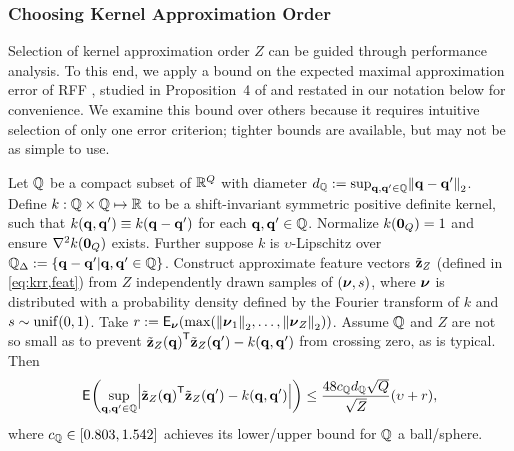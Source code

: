 \subsubsection{Choosing Kernel Approximation Order}
\label{sss,krr,pract,mod,h}

Selection of kernel approximation order $Z$ 
can be guided through performance analysis.  
To this end, 
we apply a bound 
on the expected maximal approximation error 
of RFF \cite{rahimi:07:rff},
studied in Proposition~4 of \cite{sutherland:15:ote}
and restated in our notation below for convenience.
We examine this bound over others
because it requires intuitive selection 
of only one error criterion;
tighter bounds are available,
but may not be as simple to use.
\begin{thm}
	Let $\mathbb{Q}$ 
	be a compact subset of $\mathbb{R}^{Q}$
	with diameter $d_\setQ := \sup_{\bmq,\bmq' \in \setQ} \norm{\bmq-\bmq'}_2$.
	Define $k : \mathbb{Q} \times \mathbb{Q} \mapsto \mathbb{R}$  
	to be a shift-invariant symmetric positive definite kernel,
	such that $k(\mathbf{q},\mathbf{q}') \equiv k(\mathbf{q}-\mathbf{q}')$
	for each $\mathbf{q},\mathbf{q}' \in \mathbb{Q}$.
	Normalize $k(\boldsymbol{0}_{Q}) = 1$ 
	and ensure $\nabla^2 k(\boldsymbol{0}_{Q})$ exists.
	Further suppose $k$ is $\upsilon$-Lipschitz 
	over $\setQD := \set{\bmq-\bmq'|\bmq,\bmq'\in\setQ}$.
	Construct approximate feature vectors $\tilde{\mathbf{z}}_Z$
	(defined in \eqref{eq:krr,feat})
	from $Z$ independently drawn samples of $\paren{\bmnu,s}$,
	where $\boldsymbol{\nu}$ is distributed 
	with a probability density defined by the Fourier transform of $k$
	and $s \sim \unif{0,1}$.
	Take $r := \expect{\bmnu}{\max\paren{\norm{\bmnu_1}_2,\dots,\norm{\bmnu_Z}_2}}$.
	Assume $\mathbb{Q}$ and $Z$ are not so small
	as to prevent $\bmztZa{\bmq}\tpose\bmztZa{\bmq'}-k\paren{\bmq,\bmq'}$
	from crossing zero, as is typical. Then
	\label{thm:rff-approx}
	\begin{align}
		\expect{}{\sup_{\bmq,\bmq' \in \setQ} 
			\abs{\bmztZa{\bmq}\tpose\bmztZa{\bmq'}-k\paren{\bmq,\bmq'}}}
			\leq 
			\frac{48 c_\setQ d_\setQ \sqrt{Q}}{\sqrt{Z}} \paren{\upsilon + r},
			\label{eq:krr,rff-approx}
	\end{align}
	where $c_\setQ \in \brac{0.803,1.542}$
	achieves its lower/upper bound for $\mathbb{Q}$ a ball/sphere.
\end{thm}


